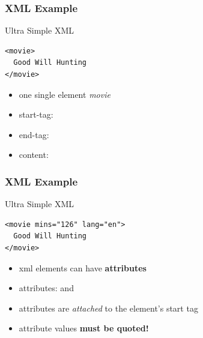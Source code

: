 \documentclass{beamer}\usepackage[]{graphicx}\usepackage[]{color}
\begin{document}

\begin{frame}[fragile]
\frametitle{XML Example}

\begin{block}{Ultra Simple XML}
\begin{verbatim}
<movie>
  Good Will Hunting
</movie>
\end{verbatim}
\end{block}

\bigskip

\begin{itemize}
 \item one single element {\textit{movie}}
 \item start-tag: 
 \item end-tag: 
 \item content: 
\end{itemize}

\end{frame}


\begin{frame}[fragile]
\frametitle{XML Example}

\begin{block}{Ultra Simple XML}
\begin{verbatim}
<movie mins="126" lang="en">
  Good Will Hunting
</movie>
\end{verbatim}
\end{block}

\bigskip

\begin{itemize}
 \item xml elements can have \textbf{attributes}
 \item attributes:   and  
 \item attributes are \textit{attached} to the element's start tag
 \item attribute values \textbf{must be quoted!}
\end{itemize}

\end{frame}

\end{document}
